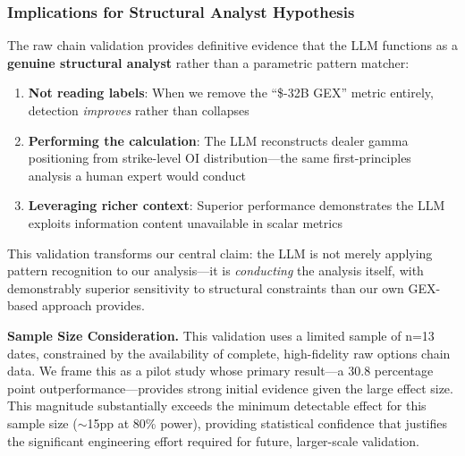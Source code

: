 \subsubsection{Implications for Structural Analyst Hypothesis}

The raw chain validation provides definitive evidence that the LLM functions as a \textbf{genuine structural analyst} rather than a parametric pattern matcher:

\begin{enumerate}
    \item \textbf{Not reading labels}: When we remove the ``\$-32B GEX'' metric entirely, detection \textit{improves} rather than collapses
    \item \textbf{Performing the calculation}: The LLM reconstructs dealer gamma positioning from strike-level OI distribution—the same first-principles analysis a human expert would conduct
    \item \textbf{Leveraging richer context}: Superior performance demonstrates the LLM exploits information content unavailable in scalar metrics
\end{enumerate}

This validation transforms our central claim: the LLM is not merely applying pattern recognition to our analysis—it is \textit{conducting} the analysis itself, with demonstrably superior sensitivity to structural constraints than our own GEX-based approach provides.

\textbf{Sample Size Consideration.} This validation uses a limited sample of n=13 dates, constrained by the availability of complete, high-fidelity raw options chain data. We frame this as a pilot study whose primary result—a 30.8 percentage point outperformance—provides strong initial evidence given the large effect size. This magnitude substantially exceeds the minimum detectable effect for this sample size ($\sim$15pp at 80\% power), providing statistical confidence that justifies the significant engineering effort required for future, larger-scale validation.

